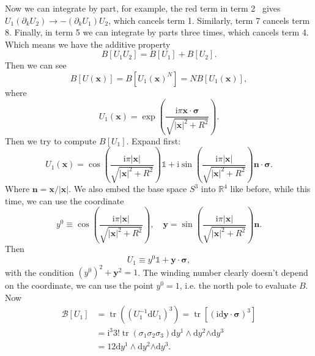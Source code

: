 \documentclass{book}
\begin{document}
Now we can integrate by part, for example, the red term in term 2 \ gives $U_{1}( \partial _{k} U_{2})\rightarrow -( \partial _{k} U_{1}) U_{2}$, which cancels term 1. Similarly, term 7 cancels term 8. Finally, in term 5 we can integrate by parts three times, which cancels term 4. Which means we have the additive property
\begin{equation*}
B[ U_{1} U_{2}] =B[ U_{1}] +B[ U_{2}] .
\end{equation*}
Then we can see
\begin{equation*}
B[ U(\boldsymbol{x})] =B[U_{1}(\boldsymbol{x})^{N} ]=NB[ U_{1}(\boldsymbol{x})] ,
\end{equation*}
where
\begin{equation*}
U_{1} (\boldsymbol{x} )=\exp\left(\frac{\mathrm{i} \pi \boldsymbol{x} \cdot \boldsymbol{\sigma }}{\sqrt{|\boldsymbol{x} |^{2} +R^{2}}}\right) .
\end{equation*}
Then we try to compute $B[ U_{1}]$. Expand first:
\begin{equation*}
U_{1}(\boldsymbol{x}) =\cos\left(\frac{\mathrm{i} \pi | \boldsymbol{x}| }{\sqrt{|\boldsymbol{x} |^{2} +R^{2}}}\right)\mathds{1} +\mathrm{i}\sin\left(\frac{\mathrm{i} \pi | \boldsymbol{x}| }{\sqrt{|\boldsymbol{x} |^{2} +R^{2}}}\right)\boldsymbol{n} \cdot \boldsymbol{\sigma } .
\end{equation*}
Where $\boldsymbol{n} =\boldsymbol{x} /| \boldsymbol{x}| $. We also embed the base space $S^{3}$ into $\mathbb{R}^{4}$ like before, while this time, we can use the coordinate
\begin{equation*}
y^{0} \equiv \cos\left(\frac{\mathrm{i} \pi | \boldsymbol{x}| }{\sqrt{|\boldsymbol{x} |^{2} +R^{2}}}\right) ,\quad \boldsymbol{y} =\sin\left(\frac{\mathrm{i} \pi | \boldsymbol{x}| }{\sqrt{|\boldsymbol{x} |^{2} +R^{2}}}\right)\boldsymbol{n} .
\end{equation*}
Then
\begin{equation*}
U_{1} \equiv y^{0}\mathds{1} +\boldsymbol{y} \cdot \boldsymbol{\sigma } ,
\end{equation*}
with the condition $(y^{0} )^{2} +\boldsymbol{y}^{2} =1$. The winding number clearly doesn't depend on the coordinate, we can use the point $y^{0} =1$, i.e. the north pole to evaluate $B$. Now
\begin{equation*}
\begin{aligned}
\mathcal{B}[ U_{1}] & =\operatorname{tr} ((U_{1}^{-1}\mathrm{d} U_{1} )^{3} )=\operatorname{tr} [(\mathrm{id}\boldsymbol{y} \cdot \boldsymbol{\sigma } )^{3} ]\\
 & =\mathrm{i}^{3} 3!\operatorname{tr}( \sigma _{1} \sigma _{2} \sigma _{3})\mathrm{d} y^{1} \land \mathrm{d} y^{2}\mathrm{\land d} y^{3}\\
 & =12\mathrm{d} y^{1} \land \mathrm{d} y^{2}\mathrm{\land d} y^{3} .
\end{aligned}
\end{equation*}
\end{document}
